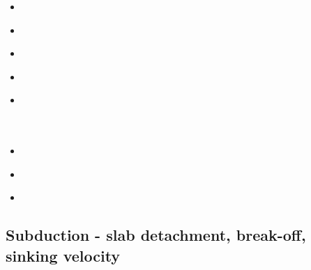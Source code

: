 \begin{scriptsize}
\begin{itemize}
\item[\nineteenninetynine]
\textcite{coha99} \\
\item[\twothousandsix]
\textcite{buff06} \\
\item[\twothousandeight]
\textcite{wuch08} \\
\item[\twothousandnine]
\textcite{fagb09} \\
\item[\twothousandtwelve]
\textcite{camo12} \\
\textcite{fagm12} \\
\textcite{bube12} \\
\item[\twothousandfourteen]
\textcite{fogm14} \\
\item[\twothousandnineteen]
\textcite{gert19} \\
\item[\twothousandtwentyone]
\textcite{sabg21} 
\end{itemize}
\end{scriptsize}



\subsection{Subduction - slab detachment, break-off, sinking velocity}

